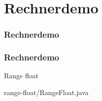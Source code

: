 \def\stitle{Rechnerdemo}
\section{\stitle}
\begin{frame}
\frametitle{\stitle}%
\tableofcontents[current]%
\end{frame}

\begin{frame}[fragile]%
  \frametitle{\stitle}%
\medskip

Range float

{range-float/RangeFloat.java}
\end{frame}
